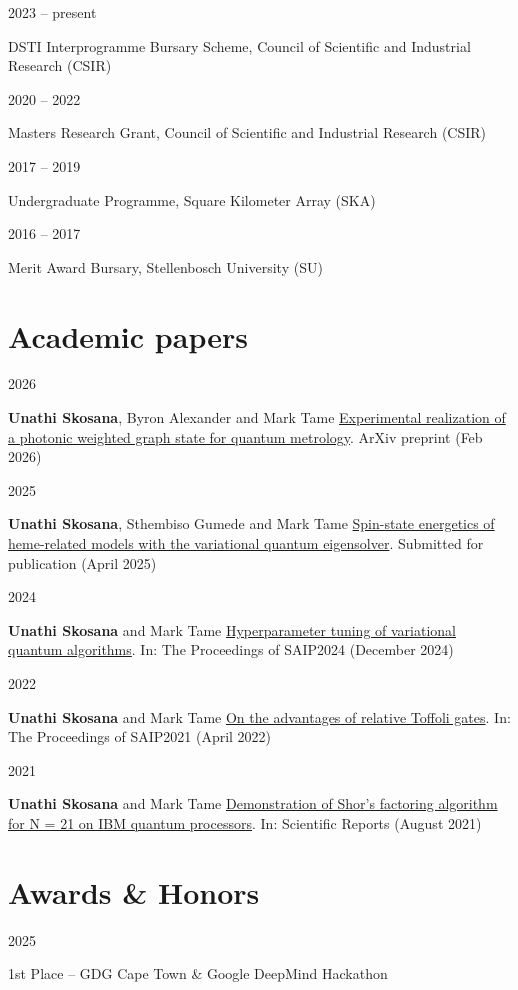 \documentclass[9pt]{extreport}
\newcommand{\entry}[2]{%
  \noindent%
  \begin{minipage}[t]{2.25cm}%
    \raggedright #1%
  \end{minipage}%
  \hspace{0.4cm}%
  \begin{minipage}[t]{\dimexpr\textwidth-2cm\relax}%
    #2%
  \end{minipage}%
  \vspace{0.25cm}%
}
\begin{document}
\entry{2023 -- present}{DSTI Interprogramme Bursary Scheme, Council of Scientific and Industrial Research (CSIR)}

\entry{2020 -- 2022}{Masters Research Grant, Council of Scientific and Industrial Research (CSIR)}


\entry{2017 -- 2019}{Undergraduate Programme, Square Kilometer Array (SKA)}

\entry{2016 -- 2017}{Merit Award Bursary, Stellenbosch University (SU)}

\newpage 

\section*{Academic papers}

\entry{2026}{\textbf{Unathi Skosana}, Byron Alexander and Mark Tame \href{https://arxiv.org/abs/2602.18177}{Experimental realization of a photonic weighted graph state for quantum metrology}. ArXiv preprint (Feb 2026)}

\entry{2025}{\textbf{Unathi Skosana}, Sthembiso Gumede and Mark Tame \href{https://arxiv.org/abs/2504.08494}{Spin-state energetics of heme-related models with the variational quantum eigensolver}. Submitted for publication (April 2025)}

\entry{2024}{\textbf{Unathi Skosana} and Mark Tame \href{https://events.saip.org.za/event/246/page/666-the-proceedings-of-saip2024}{Hyperparameter tuning of variational quantum algorithms}. In: The Proceedings of SAIP2024 (December 2024)}

\entry{2022}{\textbf{Unathi Skosana} and Mark Tame \href{https://events.saip.org.za/event/206/page/446-the-proceedings-of-saip2021}{On the advantages of relative Toffoli gates}. In: The Proceedings of SAIP2021 (April 2022)}

\entry{2021}{\textbf{Unathi Skosana} and Mark Tame \href{https://doi.org/10.1038/s41598-021-95973-w}{Demonstration of Shor's factoring algorithm for N = 21 on IBM quantum processors}. In: Scientific Reports (August 2021)}

\section*{Awards \& Honors}

\entry{2025}{1st Place -- GDG Cape Town \& Google DeepMind Hackathon}
\end{document}

